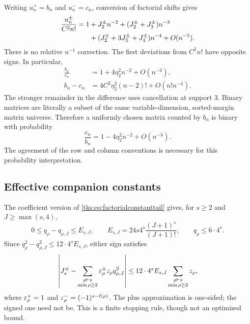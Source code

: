 Writing $u_n^+=b_n$ and $u_n^-=c_n$, conversion of factorial shifts gives
\begin{align}
\frac{u_n^\pm}{C^2n!}=1
 &+J_2^\pm n^{-2}+(J_2^\pm+J_3^\pm)n^{-3}\notag\\
 &+(J_2^\pm+3J_3^\pm+J_4^\pm)n^{-4}+O(n^{-5}).
 \label{tks:eq:companionordinary}
\end{align}
There is no relative $n^{-1}$ correction. The first deviations from $C^2n!$ have opposite signs. In particular,
\begin{align}
\frac{b_n}{c_n}&=1+4\eta_2^2n^{-2}+O(n^{-3}),\label{tks:eq:bratio}\\
b_n-c_n&=4C^2\eta_2^2(n-2)!+O(n!n^{-4}).\label{tks:eq:bdifference}
\end{align}
The stronger remainder in the difference uses cancellation at support $3$.
Binary matrices are literally a subset of the same variable-dimension, sorted-margin matrix universe. Therefore a uniformly chosen matrix counted by $b_n$ is binary with probability
\begin{equation}\label{tks:eq:binaryprob}
\frac{c_n}{b_n}=1-4\eta_2^2n^{-2}+O(n^{-3}).
\end{equation}
The agreement of the row and column conventions is necessary for this probability interpretation.

\subsection{Effective companion constants}
The coefficient version of \eqref{tks:eq:factorialconstanttail} gives, for $s\geq2$ and $J\geq\max(s,4)$,
\begin{equation}\label{tks:eq:qtail}
0\leq q_\rho-q_{\rho,J}\leq E_{s,J},\qquad
E_{s,J}=24s4^s\frac{(J+1)^s}{(J+1)!},\qquad
q_\rho\leq6\cdot4^s.
\end{equation}
Since $q_\rho^2-q_{\rho,J}^2\leq12\cdot4^sE_{s,J}$, either sign satisfies
\begin{equation}\label{tks:eq:Jtail}
\left|J_s^\pm-\sum_{\substack{\rho\vdash s\\\min\rho\geq2}}
                 \varepsilon_\rho^\pm z_\rho q_{\rho,J}^2\right|
 \leq12\cdot4^sE_{s,J}\sum_{\substack{\rho\vdash s\\\min\rho\geq2}}z_\rho,
\end{equation}
where $\varepsilon_\rho^+=1$ and $\varepsilon_\rho^-=(-1)^{s-\ell(\rho)}$. The plus approximation is one-sided; the signed one need not be. This is a finite stopping rule, though not an optimized bound.

